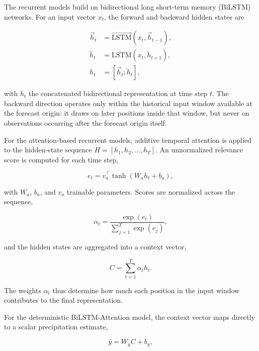 \documentclass[referee,pdflatex,sn-basic]{sn-jnl}%
\theoremstyle{thmstyleone}%
\theoremstyle{thmstyletwo}%
\theoremstyle{thmstylethree}%
\begin{document}
The recurrent models build on bidirectional long short-term memory (BiLSTM) networks. For an input vector $x_t$, the forward and backward hidden states are

\begin{align}
\overrightarrow{h}_t &= \overrightarrow{\mathrm{LSTM}}\left(x_t,\overrightarrow{h}_{t-1}\right), \label{eq:bilstm_forward} \\
\overleftarrow{h}_t &= \overleftarrow{\mathrm{LSTM}}\left(x_t,\overleftarrow{h}_{t+1}\right), \label{eq:bilstm_backward} \\
h_t &= \left[\overrightarrow{h}_t;\overleftarrow{h}_t\right], \label{eq:bilstm_concat}
\end{align}

with $h_t$ the concatenated bidirectional representation at time step $t$. The backward direction operates only within the historical input window available at the forecast origin: it draws on later positions inside that window, but never on observations occurring after the forecast origin itself.

For the attention-based recurrent models, additive temporal attention is applied to the hidden-state sequence $H=[h_1,h_2,\ldots,h_T]$. An unnormalized relevance score is computed for each time step,

\begin{equation}
e_t = v_a^{\top} \tanh\left(W_a h_t+b_a\right),
\label{eq:attn_score}
\end{equation}

with $W_a$, $b_a$, and $v_a$ trainable parameters. Scores are normalized across the sequence,

\begin{equation}
\alpha_t = \frac{\exp(e_t)}{\displaystyle\sum_{j=1}^{T}\exp(e_j)},
\label{eq:attn_weight}
\end{equation}

and the hidden states are aggregated into a context vector,

\begin{equation}
C = \sum_{t=1}^{T} \alpha_t h_t .
\label{eq:attn_context}
\end{equation}

The weights $\alpha_t$ thus determine how much each position in the input window contributes to the final representation.

For the deterministic BiLSTM-Attention model, the context vector maps directly to a scalar precipitation estimate,

\begin{equation}
\hat{y} = W_y C+b_y ,
\label{eq:det_output}
\end{equation}
\end{document}
